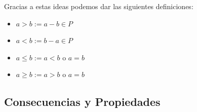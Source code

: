 \documentclass[12pt, fleqn]{report}                             %
\theoremstyle{break}                                            %
\begin{document}
                Gracias a estas ideas podemos dar las siguientes definiciones:
                \begin{itemize}
                    \item $a > b    := a - b \in P$
                    \item $a < b    := b - a \in P$
                    \item $a \leq b := a < b $ o $a = b$
                    \item $a \geq b := a > b $ o $a = b$
                \end{itemize}


            \clearpage
            \subsection{Consecuencias y Propiedades}
\end{document}
